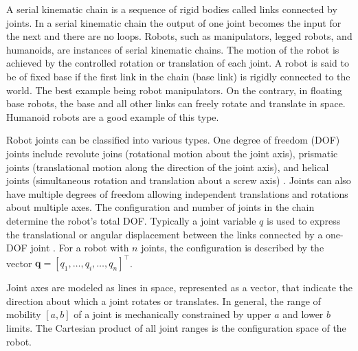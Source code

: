 A serial kinematic chain is a sequence of rigid bodies called links connected by joints. In a serial kinematic chain the output of one joint becomes the input for the next and there are no loops. Robots, such as manipulators, legged robots, and humanoids, are instances of serial kinematic chains. The motion of the robot is achieved by the controlled rotation or translation of each joint.  A robot is said to be of fixed base if the first link in the chain (base link) is rigidly connected to the world. The best example being robot manipulators. On the contrary, in floating base robots, the base and all other links can freely rotate and translate in space. Humanoid robots are a good example of this type.

Robot joints can be classified into various types. One degree of freedom (DOF) joints include revolute joins (rotational motion about the joint axis), prismatic joints (translational motion along the direction of the joint axis), and  helical joints (simultaneous rotation and translation about a screw axis) \cite{Lynch2017Modernrobotics}. Joints can also have multiple degrees of freedom allowing independent translations and rotations about multiple axes. The configuration and number of joints in the chain determine the robot's total DOF. Typically a joint variable $q$ is used to express the translational or angular displacement between the links connected by a one-DOF joint \cite{Xie2003FundamentalsRoboticsLinking}. For a robot with $n$ joints, the configuration is described by the vector $\bm{q} = [q_1,\ldots,q_i,\ldots,q_n]^\intercal$.

Joint axes are modeled as lines in space, represented as a vector, that indicate the direction about which a joint rotates or translates. In general, the range of mobility $\left[a,b\right] $ of a joint is mechanically constrained by upper $a$ and lower $b$ limits. The Cartesian product of all joint ranges is the configuration space of the robot.

